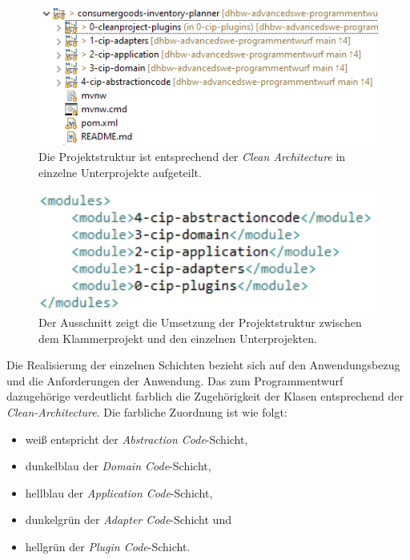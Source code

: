 \begin{figure}[H]
	\centering
	\includegraphics[width=1.0\textwidth]{Bilder/projektstruktur.PNG}
	\caption[Aufteilung der Projektstruktur entsprechend \textit{Clean Architecture}.]{Die Projektstruktur ist entsprechend der \textit{Clean Architecture} in einzelne Unterprojekte aufgeteilt.}
	\label{fig:projektstruktur}
\end{figure}

\begin{figure}[H]
	\centering
	\includegraphics[width=1.0\textwidth]{Bilder/ausschnitt-pom.PNG}
	\caption[Ausschnitt aus der pom.xml zur Projektstruktur.]{Der Ausschnitt zeigt die Umsetzung der Projektstruktur zwischen dem Klammerprojekt und den einzelnen Unterprojekten.}
	\label{fig:umsetzung-pom}
\end{figure}

Die Realisierung der einzelnen Schichten bezieht sich auf den Anwendungsbezug und die Anforderungen der Anwendung.
Das zum Programmentwurf dazugehörige \href{https://github.com/lucasmerkel/dhbw-advancedswe-programmentwurf/blob/d5c89113d12c3b877ddc4d6a99225b277ddd468f/Documentation/Bilder/uml-diagramme/klassendiagramm.svg}{} verdeutlicht farblich die Zugehörigkeit der Klasen entsprechend der \textit{Clean-Architecture}.
Die farbliche Zuordnung ist wie folgt:
\begin{itemize}
    \item weiß entspricht der \textit{Abstraction Code}-Schicht,
    \item dunkelblau der \textit{Domain Code}-Schicht,
    \item hellblau der \textit{Application Code}-Schicht,
    \item dunkelgrün der \textit{Adapter Code}-Schicht und
    \item hellgrün der \textit{Plugin Code}-Schicht.
\end{itemize}

